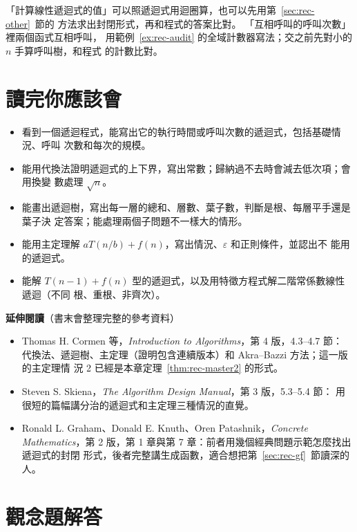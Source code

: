 「計算線性遞迴式的值」可以照遞迴式用迴圈算，也可以先用第~\ref{sec:rec-other}~節的
方法求出封閉形式，再和程式的答案比對。 「互相呼叫的呼叫次數」裡兩個函式互相呼叫，
用範例~\ref{ex:rec-audit} 的全域計數器寫法；交之前先對小的 $n$ 手算呼叫樹，和程式
的計數比對。

\section{讀完你應該會}
\label{sec:rec-checklist}

\begin{itemize}
\item 看到一個遞迴程式，能寫出它的執行時間或呼叫次數的遞迴式，包括基礎情況、呼叫
次數和每次的規模。
\item 能用代換法證明遞迴式的上下界，寫出常數；歸納過不去時會減去低次項；會用換變
數處理 $\sqrt{n}$。
\item 能畫出遞迴樹，寫出每一層的總和、層數、葉子數，判斷是根、每層平手還是葉子決
定答案；能處理兩個子問題不一樣大的情形。
\item 能用主定理解 $aT(n/b) + f(n)$，寫出情況、$\varepsilon$ 和正則條件，並認出不
能用的遞迴式。
\item 能解 $T(n-1) + f(n)$ 型的遞迴式，以及用特徵方程式解二階常係數線性遞迴（不同
根、重根、非齊次）。
\end{itemize}

\textbf{延伸閱讀}（書末會整理完整的參考資料）

\begin{itemize}
\item Thomas H. Cormen 等，\textit{Introduction to Algorithms}，第 4 版，4.3--4.7 節：
代換法、遞迴樹、主定理（證明包含連續版本）和 Akra--Bazzi 方法；這一版的主定理情
況 2 已經是本章定理~\ref{thm:rec-master2} 的形式。
\item Steven S. Skiena，\textit{The Algorithm Design Manual}，第 3 版，5.3--5.4 節：
用很短的篇幅講分治的遞迴式和主定理三種情況的直覺。
\item Ronald L. Graham、Donald E. Knuth、Oren Patashnik，\textit{Concrete
Mathematics}，第 2 版，第 1 章與第 7 章：前者用幾個經典問題示範怎麼找出遞迴式的封閉
形式，後者完整講生成函數，適合想把第~\ref{sec:rec-gf}~節讀深的人。
\end{itemize}

\section*{觀念題解答}

